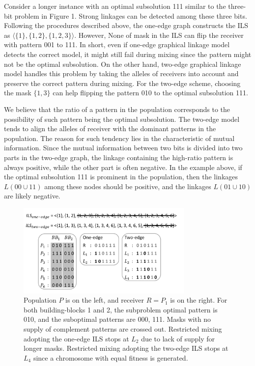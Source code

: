 \documentclass{sig-alternate-05-2015}
\begin{document}
Consider a longer instance with an optimal subsolution 111 similar to the three-bit problem in Figure 1. Strong linkages can be detected among these three bits. Following the procedures described above, the one-edge graph constructs the ILS as $\langle\{1\}, \{1, 2\}, \{1, 2, 3\}\rangle$. However, None of mask in the ILS can flip the receiver with pattern 001 to 111. In short, even if one-edge graphical linkage model detects the correct model, it might still fail during mixing since the pattern might not be the optimal subsolution. On the other hand, two-edge graphical linkage model  handles this problem by taking the alleles of receivers into account and preserve the correct pattern during mixing. For the two-edge scheme, choosing the mask $\{1, 3\}$ can help flipping the pattern 010 to the optimal subsolution 111.   

We believe that the ratio of a pattern in the population corresponds to the possibility of such pattern being the optimal subsolution. The two-edge model tends to align the alleles of receiver  with the dominant patterns in the population. The reason for such tendency lies in the characteristic of mutual information. Since the mutual information between two bits is divided into two parts in the two-edge graph,  the  linkage containing the high-ratio pattern  is always positive, while the other part is often negative.  In the example above, if the optimal subsolution 111 is prominent in the population, then the linkages $L(00\cup11)$ among these nodes should be positive, and the linkages $L(01\cup10)$ are likely negative.  



\begin{figure}
\centering
\includegraphics[width=3.4in]{SupplyBound}
\caption{Population $ P $ is on the left, and receiver $ R  = P_{1} $ is on the right. For both building-blocks 1 and 2, the subproblem optimal pattern is 010, and the suboptimal patterns are 000, 111. Masks with no supply of complement patterns are crossed out. Restricted mixing adopting the one-edge ILS stops at $ L_{2}$ due to lack of supply for longer masks. Restricted mixing adopting the two-edge ILS stops at $ L_{4} $ since a chromosome with equal fitness is generated.}
\end{figure}
\end{document}
